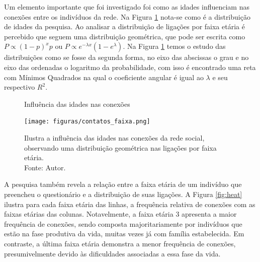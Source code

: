 Um elemento importante que foi investigado foi como as idades influenciam nas conexões entre os indivíduos da rede. Na Figura \ref{fig:contatos_faixa} nota-se como é a distribuição de idades da pesquisa. Ao analisar a distribuição de ligações por faixa etária é percebido que seguem uma distribuição geométrica, que pode ser escrita como $P \propto (1 - p)^xp$ ou $P \propto e^{-\lambda x}(1 - e^\lambda)$. Na Figura \ref{fig:contatos_faixa} temos o estudo das distribuições como se fosse da segunda forma, no eixo das abscissas o grau e no eixo das ordenadas o logaritmo da probabilidade, com isso é encontrado uma reta com Mínimos Quadrados na qual o coeficiente angular é igual ao $\lambda$ e seu respectivo $R^2$. 

\begin{figure}[H]
    \centering
    \captionsetup{font=normalsize,skip=0.8pt,singlelinecheck=on,labelsep=endash}
    \caption{Influência das idades nas conexões}
    \texttt{[image: figuras/contatos\_faixa.png]}
    \captionsetup{font=small,justification=justified}
    \caption*{Ilustra a influência das idades nas 
    conexões da rede social, observando uma distribuição geométrica nas ligações por faixa etária.\\ Fonte: Autor.}
    \label{fig:contatos_faixa}
\end{figure}

A pesquisa também revela a relação entre a faixa etária de um indivíduo que preencheu o questionário e a distribuição de suas ligações. A Figura \ref{fig:heat} ilustra para cada faixa etária das linhas, a frequência relativa de conexões com as faixas etárias das colunas. Notavelmente, a faixa etária 3 apresenta a maior frequência de conexões, sendo composta majoritariamente por indivíduos que estão na fase produtiva da vida, muitas vezes já com família estabelecida. Em contraste, a última faixa etária demonstra a menor frequência de conexões, presumivelmente devido às dificuldades associadas a essa fase da vida.

